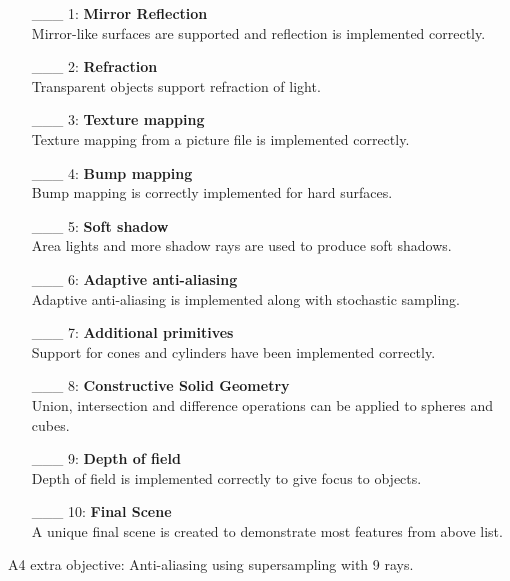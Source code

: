 \documentclass {article}
\begin{document}
\begin{enumerate}
     \item[\_\_\_ 1:]  {\bf Mirror Reflection}\\
	 Mirror-like surfaces are supported and reflection is implemented correctly.

     \item[\_\_\_ 2:]  {\bf Refraction}\\
	 Transparent objects support refraction of light.

     \item[\_\_\_ 3:]  {\bf Texture mapping}\\
	 Texture mapping from a picture file is implemented correctly.

     \item[\_\_\_ 4:]  {\bf Bump mapping}\\
	 Bump mapping is correctly implemented for hard surfaces.

     \item[\_\_\_ 5:]  {\bf Soft shadow}\\
	 Area lights and more shadow rays are used to produce soft shadows.

     \item[\_\_\_ 6:]  {\bf Adaptive anti-aliasing}\\
	 Adaptive anti-aliasing is implemented along with stochastic sampling.

     \item[\_\_\_ 7:]  {\bf Additional primitives}\\
	 Support for cones and cylinders have been implemented correctly.

     \item[\_\_\_ 8:]  {\bf Constructive Solid Geometry}\\
	 Union, intersection and difference operations can be applied to spheres and cubes.

     \item[\_\_\_ 9:]  {\bf Depth of field}\\
	 Depth of field is implemented correctly to give focus to objects.

     \item[\_\_\_ 10:] {\bf Final Scene}\\
	 A unique final scene is created to demonstrate most features from above list.

\end{enumerate}

A4 extra objective: Anti-aliasing using supersampling with 9 rays.
\end{document}
